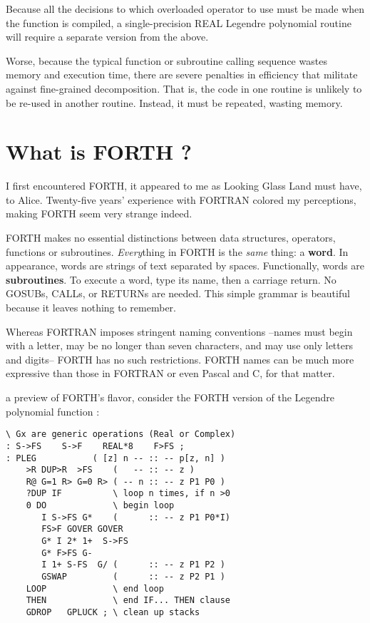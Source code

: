 Because all the decisions to which overloaded operator to use must be made when the function is compiled, a single-precision REAL Legendre polynomial routine will require a separate version from the above.

Worse, because the typical function or subroutine calling sequence wastes memory and execution time, there are severe penalties in efficiency that militate against fine-grained decomposition. That is, the code in one routine is unlikely to be re-used in another routine. Instead, it must be repeated, wasting memory. 

\section{What is FORTH ?}
 I first encountered FORTH, it appeared to me as Looking Glass Land must have, to Alice. Twenty-five years' experience with FORTRAN colored my perceptions, making FORTH seem very strange indeed.

FORTH makes no essential distinctions between data structures, operators, functions or subroutines. \textit{Every}thing in FORTH is the \textit{same} thing: a \textbf{word}. In appearance, words are strings of text separated by spaces. Functionally, words are \textbf{subroutines}. To execute a word, type its name, then a carriage return. No GOSUBs, CALLs, or RETURNs are needed. This simple grammar is beautiful because it leaves nothing to remember.

Whereas FORTRAN imposes stringent naming conventions --names must begin with a letter, may be no longer than seven characters, and may use only letters and digits-- FORTH has no such restrictions. FORTH names can be much more expressive than those in FORTRAN or even Pascal and C, for that matter.

 a preview of FORTH's flavor, consider the FORTH version of the Legendre polynomial function :

\begin{lstlisting}
\ Gx are generic operations (Real or Complex)
: S->FS    S->F    REAL*8    F>FS ;
: PLEG           ( [z] n -- :: -- p[z, n] )
    >R DUP>R  >FS    (   -- :: -- z )
    R@ G=1 R> G=0 R> ( -- n :: -- z P1 P0 )
    ?DUP IF          \ loop n times, if n >0
    0 DO             \ begin loop
       I S->FS G*    (      :: -- z P1 P0*I)
       FS>F GOVER GOVER
       G* I 2* 1+  S->FS
       G* F>FS G-
       I 1+ S-FS  G/ (      :: -- z P1 P2 )
       GSWAP         (      :: -- z P2 P1 )
    LOOP             \ end loop
    THEN             \ end IF... THEN clause
    GDROP   GPLUCK ; \ clean up stacks
\end{lstlisting}


